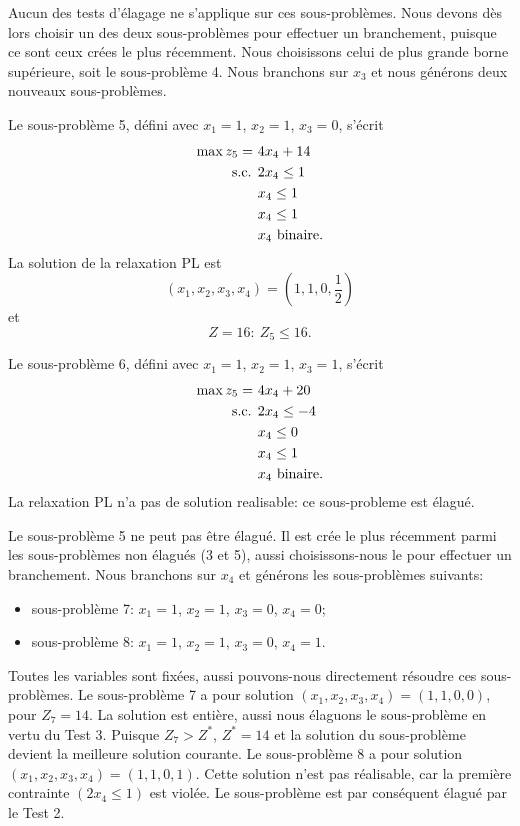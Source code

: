 \begin{example}[suite]
Aucun des tests d'élagage ne s'applique sur ces sous-problèmes.
Nous devons dès lors choisir un des deux sous-problèmes pour effectuer un branchement, puisque ce sont ceux crées le plus récemment.
Nous choisissons celui de plus grande borne supérieure, soit le sous-problème 4.
Nous branchons sur $x_3$ et nous générons deux nouveaux sous-problèmes.

Le sous-problème 5, défini avec $x_1 = 1$, $x_2 = 1$, $x_3 = 0$, s'écrit
\begin{align*}
\max z_5 =\ & 4x_4 + 14 \\
\mbox{s.c. }{} & 2x_4 \leq 1 \\
& x_4 \leq 1 \\
& x_4 \leq 1 \\
& x_4 \mbox{ binaire}.
\end{align*}
La solution de la relaxation PL est
\[
( x_1, x_2, x_3, x_4) = \left(1,1,0, \frac{1}{2} \right)
\]
et
\[
Z = 16:\ Z_5 \leq 16.
\]

Le sous-problème 6, défini avec $x_1 = 1$, $x_2 = 1$, $x_3 = 1$, s'écrit
\begin{align*}
\max z_5 =\ & 4x_4 + 20 \\
\mbox{s.c. }{} & 2x_4 \leq -4 \\
& x_4 \leq 0 \\
& x_4 \leq 1 \\
& x_4 \mbox{ binaire}.
\end{align*}
La relaxation PL n'a pas de solution realisable: ce sous-probleme est élagué.

Le sous-problème 5 ne peut pas être élagué.
Il est crée le plus récemment parmi les sous-problèmes non élagués (3 et 5), aussi choisissons-nous le pour effectuer un branchement.
Nous branchons sur $x_4$ et générons les sous-problèmes suivants:
\begin{itemize}
\item
sous-problème 7: $x_1 = 1$, $x_2 = 1$, $x_3 = 0$, $x_4 = 0$;
\item
sous-problème 8: $x_1 = 1$, $x_2 = 1$, $x_3 = 0$, $x_4 = 1$.
\end{itemize}
Toutes les variables sont fixées, aussi pouvons-nous directement résoudre ces sous-problèmes. 
Le sous-problème 7 a pour solution $(x_1, x_2, x_3, x_4) = (1, 1, 0, 0)$, pour $Z_7 = 14$.
La solution est entière, aussi nous élaguons le sous-problème en vertu du Test 3.
Puisque $Z_7 > Z^*$, $Z^* = 14$ et la solution du sous-problème devient la meilleure solution courante.
Le sous-problème 8 a pour solution $(x_1, x_2, x_3, x_4) = (1, 1, 0, 1)$.
Cette solution n'est pas réalisable, car la première contrainte $(2x_4 \leq 1)$ est violée.
Le sous-problème est par conséquent élagué par le Test 2.


\end{example}
